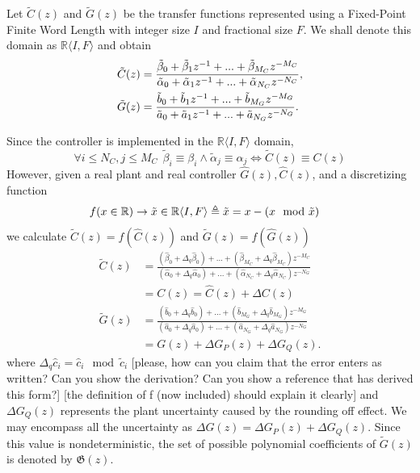 \documentclass{sig-alternate-05-2015}
\newcommand{\red}[1]{{\color{red}#1}}
\newcommand{\green}[1]{{\color{green}#1}}
\begin{document}
Let $\tilde C(z)$ and $\tilde G(z)$ be the transfer functions represented
using a Fixed-Point Finite Word Length with integer size $I$ and fractional
size $F$.  We shall denote this domain as $\mathbb{R}\langle I,F \rangle$ and obtain 
%
\begin{align}
\small
\label{digital_controller_plant_tf}
\tilde C(z)&=\frac{\tilde \beta_{0}+\tilde \beta_{1}z^{-1}+...+\tilde \beta_{M_C}z^{-M_C}}{\tilde \alpha_{0}+\tilde \alpha_{1}z^{-1}+...+\tilde \alpha_{N_C}z^{-N_C}}, \\
\tilde G(z)&=\frac{\tilde b_{0}+\tilde b_{1}z^{-1}+...+\tilde b_{M_G}z^{-M_G}}{\tilde a_{0}+\tilde a_{1}z^{-1}+...+\tilde a_{N_G}z^{-N_G}}.
\end{align}
 
Since the controller is implemented in the $\mathbb{R}\langle I,F \rangle$
domain,
%
 $$\forall i \leq N_C, j \leq M_C\ \  \tilde \beta_{i} \equiv \beta_{i} \wedge \tilde \alpha_{j} \equiv \alpha_{j} \Leftrightarrow \tilde C(z) \equiv C(z)$$
%
However, given a real plant and real controller $\hat{G}(z), \hat{C}(z)$, and a discretizing function
\begin{align}
\small
\label{FWL_tf}
&f (x \in \mathbb{R}) \rightarrow \tilde x \in \mathbb{R}\langle I,F \rangle \triangleq \tilde x = x-(x\mod\tilde x)
\end{align}
we calculate $\tilde C(z)=f(\hat{C}(z))$ and $\tilde G(z)=f(\hat{G}(z))$
\begin{align}
\label{digital_controller_tf}
\tilde C(z)&=\frac{(\hat{\beta}_{0}+\Delta_q \hat{\beta}_{0}) +...+(\hat{\beta}_{M_C}+\Delta_q \hat{\beta}_{M_C})z^{-M_C}}{(\hat{\alpha}_{0}+\Delta_q \hat{\alpha}_{0})+...+(\hat{\alpha}_{N_C}+\Delta_q \hat{\alpha}_{N_C})z^{-N_G}} \nonumber \\
&= C(z) =\hat{C}(z) + \Delta{C}(z)\\
\label{digital_plant_tf}
\tilde G(z)&=\frac{(\hat{b}_{0}+\Delta_q \hat{b}_{0}) +...+(\hat{b}_{M_G}+\Delta_q \hat{b}_{M_G})z^{-M_G}}{(\hat{a}_{0}+\Delta_q \hat{a}_{0})+...+(\hat{a}_{N_G}+\Delta_q \hat{a}_{N_G})z^{-N_G}} \nonumber \\
&=G(z)+\Delta{G}_P(z)+\Delta{G}_Q(z).
\end{align}
where $\Delta_q\hat{c}_i=\hat{c}_i\mod \tilde{c}_i$
\red{[please, how can you claim that the error enters as written? Can you show the derivation? Can you show a reference that has derived this form?]}
\green{[the definition of f (now included) should explain it clearly]}
and $\Delta{G}_Q(z)$ represents the plant uncertainty caused by
the rounding off effect.  We may encompass all the uncertainty as
$\Delta{G}(z)=\Delta{G}_P(z)+\Delta{G}_Q(z)$.  Since this value is
nondeterministic, the set of possible polynomial coefficients of $\tilde G(z)$ is
denoted by $\mathfrak{G}(z)$.
\end{document}
